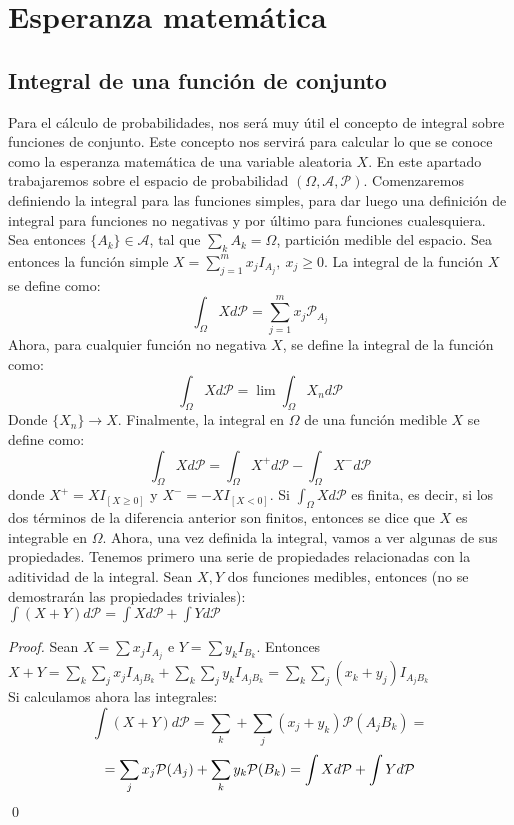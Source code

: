 \chapter{Esperanza matemática}

\section{Integral de una función de conjunto}

Para el cálculo de probabilidades, nos será muy útil el concepto de integral sobre funciones de conjunto. Este concepto nos servirá para calcular lo que se conoce como la esperanza matemática de una variable aleatoria $X$. En este apartado trabajaremos sobre el espacio de probabilidad $(\Omega, \mathcal{A}, \mathcal{P})$. Comenzaremos definiendo la integral para las funciones simples, para dar luego una definición de integral para funciones no negativas y por último para funciones cualesquiera.\\

Sea entonces $\{A_k\} \in \mathcal{A}$, tal que $\displaystyle \sum_k A_k = \Omega$, partición medible del espacio. Sea entonces la función simple $X = \displaystyle \sum_{j=1}^m x_jI_{A_j},\ x_j \geq 0$. La integral de la función $X$ se define como:
$$\int_{\Omega} X d\mathcal{P} = \sum_{j=1}^m x_j\mathcal{P}_{A_j}$$
Ahora, para cualquier función no negativa $X$, se define la integral de la función como:
$$\int_{\Omega} X d\mathcal{P} = \lim \int_{\Omega}X_n d \mathcal{P}$$
Donde $\{X_{n}\} \to X$. Finalmente, la integral en $\Omega$ de una función medible $X$ se define como:
$$\int_{\Omega} X d\mathcal{P} = \int_{\Omega}X^{+} d\mathcal{P} - \int_{\Omega} X^{-} d\mathcal{P}$$
donde $X^{+} = XI_{[X\geq0]}$ y $X^{-} = -XI_{[X<0]}$. Si $\displaystyle \int_{\Omega}Xd\mathcal{P}$ es finita, es decir, si los dos términos de la diferencia anterior son finitos, entonces se dice que $X$ es integrable en $\Omega$. Ahora, una vez definida la integral, vamos a ver algunas de sus propiedades. Tenemos primero una serie de propiedades relacionadas con la aditividad de la integral. Sean $X,Y$ dos funciones medibles, entonces (no se demostrarán las propiedades triviales):\\

$\displaystyle \int (X+Y)d\mathcal{P} = \int Xd\mathcal{P} + \int Yd\mathcal{P}$\\

\begin{proof}

Sean $X = \displaystyle \sum x_jI_{A_j}$ e $Y = \displaystyle \sum y_kI_{B_k}$. Entonces $X+Y = \displaystyle \sum_k \sum_j x_j I_{A_jB_k} + \sum_k \sum_j y_k I_{A_jB_k} = \sum_k \sum_j (x_k+y_j) I_{A_jB_k}$\\

Si calculamos ahora las integrales:
$$ \int (X+Y)d\mathcal{P} = \sum_k + \sum_j (x_j + y_k) \mathcal{P}(A_jB_k) =$$
$$ = \sum_j x_j \mathcal{P}(A_j) + \sum_k y_k \mathcal{P}(B_k) = \int Xd\mathcal{P} + \int Yd\mathcal{P}\\$$
\qed
\end{proof}

